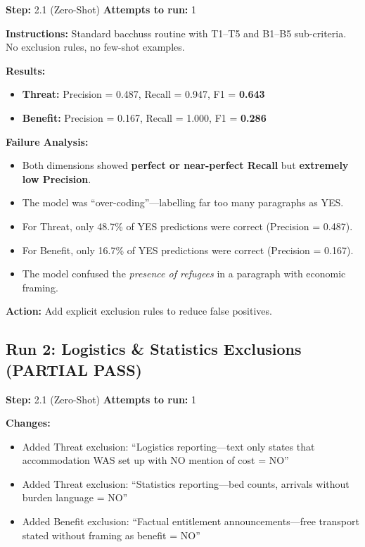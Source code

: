 \textbf{Step:} 2.1 (Zero-Shot) \quad \textbf{Attempts to run:} 1

\textbf{Instructions:} Standard bacchuss routine with T1--T5 and B1--B5 sub-criteria. No exclusion rules, no few-shot examples.

\textbf{Results:}
\begin{itemize}
    \item \textbf{Threat:} Precision = 0.487, Recall = 0.947, F1 = \textbf{0.643}
    \item \textbf{Benefit:} Precision = 0.167, Recall = 1.000, F1 = \textbf{0.286}
\end{itemize}

\textbf{Failure Analysis:}
\begin{itemize}
    \item Both dimensions showed \textbf{perfect or near-perfect Recall} but \textbf{extremely low Precision}.
    \item The model was ``over-coding''---labelling far too many paragraphs as YES.
    \item For Threat, only 48.7\% of YES predictions were correct (Precision = 0.487).
    \item For Benefit, only 16.7\% of YES predictions were correct (Precision = 0.167).
    \item The model confused the \textit{presence of refugees} in a paragraph with economic framing.
\end{itemize}

\textbf{Action:} Add explicit exclusion rules to reduce false positives.

\subsection{Run 2: Logistics \& Statistics Exclusions (PARTIAL PASS)}
\label{sec:run2}

\textbf{Step:} 2.1 (Zero-Shot) \quad \textbf{Attempts to run:} 1

\textbf{Changes:}
\begin{itemize}
    \item Added Threat exclusion: ``Logistics reporting---text only states that accommodation WAS set up with NO mention of cost = NO''
    \item Added Threat exclusion: ``Statistics reporting---bed counts, arrivals without burden language = NO''
    \item Added Benefit exclusion: ``Factual entitlement announcements---free transport stated without framing as benefit = NO''
\end{itemize}

